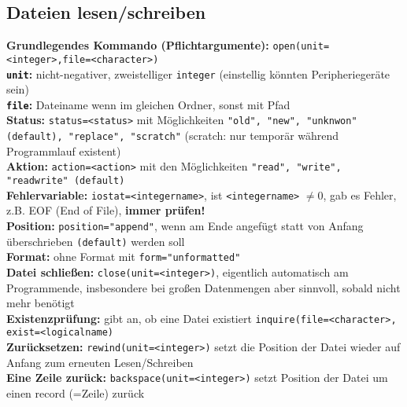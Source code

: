 \documentclass[a4paper, twocolumn]{scrarticle}
\begin{document}
\subsection{Dateien lesen/schreiben}
\textbf{Grundlegendes Kommando (Pflichtargumente):} \lstinline|open(unit=<integer>,file=<character>)|\\
\textbf{\lstinline|unit|:} nicht-negativer, zweistelliger \lstinline|integer| (einstellig könnten Peripheriegeräte sein)\\
\textbf{\lstinline|file|:} Dateiname wenn im gleichen Ordner, sonst mit Pfad\\
\textbf{Status:} \lstinline|status=<status>| mit Möglichkeiten \lstinline|"old", "new", "unknwon" (default), "replace", "scratch"| (scratch: nur temporär während Programmlauf existent)\\
\textbf{Aktion:} \lstinline|action=<action>| mit den Möglichkeiten \lstinline|"read", "write", "readwrite" (default)|\\
\textbf{Fehlervariable:} \lstinline|iostat=<integername>|, ist \lstinline|<integername>| $\neq 0$, gab es Fehler, z.B. EOF (End of File), \textbf{immer prüfen!}\\
\textbf{Position:} \lstinline|position="append"|, wenn am Ende angefügt statt von Anfang überschrieben \lstinline|(default)| werden soll\\
\textbf{Format:} ohne Format mit \lstinline|form="unformatted"|\\
\textbf{Datei schließen:} \lstinline|close(unit=<integer>)|, eigentlich automatisch am Programmende, insbesondere bei großen Datenmengen aber sinnvoll, sobald nicht mehr benötigt\\
\textbf{Existenzprüfung:} gibt an, ob eine Datei existiert \lstinline|inquire(file=<character>, exist=<logicalname)| \\
\textbf{Zurücksetzen:} \lstinline|rewind(unit=<integer>)| setzt die Position der Datei wieder auf Anfang zum erneuten Lesen/Schreiben\\
\textbf{Eine Zeile zurück:} \lstinline|backspace(unit=<integer>)| setzt Position der Datei um einen record (=Zeile) zurück
\end{document}
